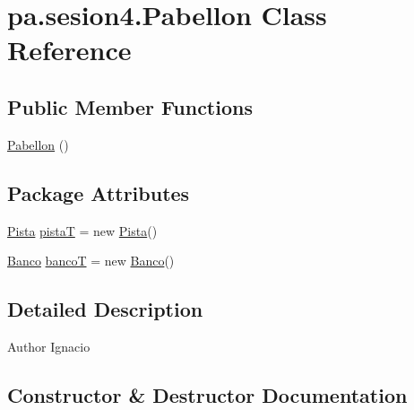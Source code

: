\hypertarget{classpa_1_1sesion4_1_1_pabellon}{}\section{pa.\+sesion4.\+Pabellon Class Reference}
\label{classpa_1_1sesion4_1_1_pabellon}
\subsection*{Public Member Functions}
\begin{DoxyCompactItemize}
\item 
\mbox{\hyperlink{classpa_1_1sesion4_1_1_pabellon_a6387fe7aee10462eb618be460b946442}{Pabellon}} ()
\end{DoxyCompactItemize}
\subsection*{Package Attributes}
\begin{DoxyCompactItemize}
\item 
\mbox{\hyperlink{classpa_1_1sesion4_1_1_pista}{Pista}} \mbox{\hyperlink{classpa_1_1sesion4_1_1_pabellon_a6cd83e22a40624083b6a0ab7a5b185cb}{pistaT}} = new \mbox{\hyperlink{classpa_1_1sesion4_1_1_pista}{Pista}}()
\item 
\mbox{\hyperlink{classpa_1_1sesion4_1_1_banco}{Banco}} \mbox{\hyperlink{classpa_1_1sesion4_1_1_pabellon_a90ebd634e348df738f11e263ce3723e6}{bancoT}} = new \mbox{\hyperlink{classpa_1_1sesion4_1_1_banco}{Banco}}()
\end{DoxyCompactItemize}


\subsection{Detailed Description}
\begin{DoxyAuthor}{Author}
Ignacio 
\end{DoxyAuthor}


\subsection{Constructor \& Destructor Documentation}
\mbox{\label{classpa_1_1sesion4_1_1_pabellon_a6387fe7aee10462eb618be460b946442}} 
